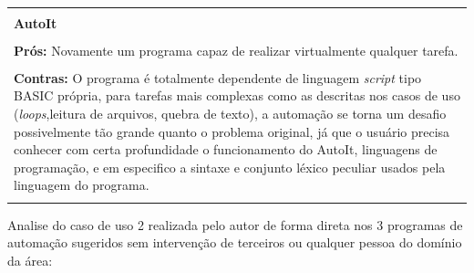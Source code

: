 \documentclass[tg]{mdtufsm}
\begin{document}
{\begin{tabular}{ | m{15.6cm} | }
		\hline \end{tabular}} \\
	{\centering \begin{tabular}{ | m{15.6cm} | }
		 \hline \\

		{\bf AutoIt} \\ \\
		{\bf Prós:} Novamente um programa capaz de realizar virtualmente qualquer tarefa. \\ \\
		{\bf Contras:}  O programa é totalmente dependente de linguagem \emph{script} tipo BASIC própria, para tarefas mais complexas como as descritas nos casos de uso (\emph{loops},leitura de arquivos, quebra de texto), a automação se torna um desafio possivelmente tão grande quanto o problema original, já que o usuário precisa conhecer com certa profundidade o funcionamento do AutoIt, linguagens de programação, e em especifico a sintaxe e conjunto léxico peculiar usados pela linguagem do programa. \\ \\

		\hline
	\end{tabular}}

	\bigskip
	Analise do caso de uso 2 realizada pelo autor de forma direta nos 3 programas de automação sugeridos sem intervenção de terceiros ou qualquer pessoa do domínio da área:
	\bigskip
\end{document}
